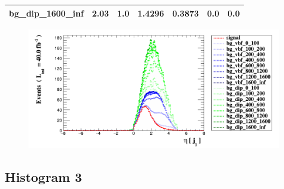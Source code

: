 \documentclass[a4paper, 10pt]{article}
\begin{document}
\begin{table}[H]
\begin{center}
\begin{tabular}{|m{23.0mm}|m{23.0mm}|m{18.0mm}|m{19.0mm}|m{19.0mm}|m{19.0mm}|m{19.0mm}|}
      \hline
      {\cellcolor{white}         bg\_dip\_1600\_inf}& {\cellcolor{white}         2.03}& {\cellcolor{white}         1.0}& {\cellcolor{white}         1.4296}& {\cellcolor{white}         0.3873}& {\cellcolor{green}         0.0}& {\cellcolor{green}         0.0}\\
\hline
    \end{tabular}
  \end{center}
\end{table}

\begin{figure}[H]
  \begin{center}
    \includegraphics[scale=0.45]{selection_1.png}\\
\caption{   }
  \end{center}
\end{figure}
      \newpage
\subsection{ Histogram 3}
\end{document}
